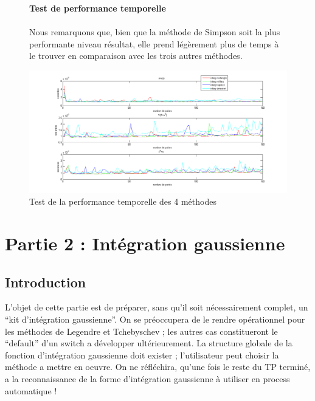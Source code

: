 \documentclass[a4paper,10pt]{report}
\begin{document}
\begin{figure}[H]
\textbf{Test de performance temporelle}
		\\
		\\
		Nous remarquons que, bien que la méthode de Simpson soit la plus performante niveau résultat, elle prend légèrement plus de temps à le trouver en comparaison avec les trois autres méthodes.
	\begin{center}
		\includegraphics[scale=0.5]{performance}
		\caption{Test de la performance temporelle des 4 méthodes}
	\end{center}
	
\end{figure}


\begin{center}

\end{center}



\newpage
\chapter*{Partie 2 : Intégration gaussienne}


\section*{Introduction}

L'objet de cette partie est de préparer, sans qu'il soit nécessairement complet, un “kit d'intégration gaussienne”. On se préoccupera de le rendre opérationnel pour les méthodes de Legendre et Tchebyschev ; les autres cas constitueront le “default” d'un switch a développer ultérieurement.
La structure globale de la fonction d'intégration gaussienne doit exister ; l'utilisateur peut choisir  la méthode a mettre en oeuvre.
On ne réfléchira, qu'une fois le reste du TP terminé, a la reconnaissance de la forme d'intégration gaussienne à utiliser en process automatique !
\end{document}
